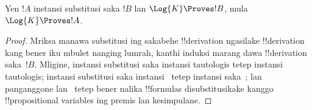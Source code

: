 \documentclass[../../../include/open-logic-section]{subfiles}
\begin{document}
\begin{prop}
  Yen $!A$ instansi substitusi saka $!B$ lan $\Log{K} \Proves !B$,
  mula $\Log{K} \Proves !A$.
\end{prop}

\begin{proof}
  Mriksa manawa substitusi ing sakabehe !!{derivation} ngasilake
  !!{derivation} kang bener iku mbulet nanging lumrah, kanthi induksi
  marang dawa !!{derivation} saka~$!B$. Mligine, instansi substitusi
  saka instansi tautologis tetep instansi tautologis; instansi
  substitusi saka instansi~
  tetep instansi saka~; lan panganggone \MP{} lan~\Nec{} tetep bener
  nalika !!{formula}s disubstitusikake kanggo
  !!{propositional variable}s ing premis lan kesimpulane.
\end{proof}
\end{document}
